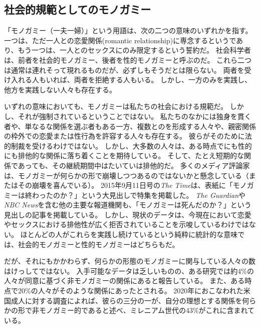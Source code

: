 \documentclass[paper=a4,book,openany]{jlreq} \usepackage{mystyle}
\begin{document}
\subsection{社会的規範としてのモノガミー}

「{モノガミー}（一夫一婦）」という用語は、次の二つの意味のいずれかを指す。
一つは、ただ一人との恋愛関係(romantic relationship)に専念するというであり、もう一つは、一人とのセックスにのみ限定するという誓約だ。
社会科学者は、前者を社会的モノガミー、後者を性的モノガミーと呼ぶのだ。
これら二つは通常は連れそって現れるものだが、必ずしもそうだとは限らない。
両者を受け入れる人もいれば、両者を拒絶する人もいる。
しかし、一方のみを実践し、他方を実践しない人々も存在する。

いずれの意味においても、モノガミーは私たちの社会における規範だ。
しかし、それが強制されているということではない。
私たちのなかには独身を貫く者や、単なるな関係を選ぶ者もある一方、複数とのを形成する人々や、親密関係の枠外での恋愛または性行為を許容する人々も存在する。
彼らがそのために法的制裁を受けるわけではない。
しかし、大多数の人々は、ある時点でにも性的にも排他的な関係に落ち着くことを期待している。
そして、たとえ短期的な関係であっても、その継続期間中はたいていは排他的だ。
多くのメディア評論家は、モノガミーが何らかの形で崩壊しつつあるのではないかと懸念している（またはその崩壊を喜んでいる）。
2015年9月11日号の\emph{The Time}は、表紙に「モノガミーは終わったのか？」という大見出しで特集を掲載した\citep{magazine15:_is_monog_over}。
\emph{The Guardian}や\emph{NBC News}を含む他の主要な報道機関も、「モノガミーは死んだのか？」という見出しの記事を掲載している\citep{alexander05:_is_monog_dead,jeffries12:_sex_issue}。
しかし、現状のデータは、今現在において恋愛やセックスにおける排他性が広く拒否されていることを示唆しているわけではない。
ほとんどの人がこれらを実践し続けているという純粋に統計的な意味では、社会的モノガミーと性的モノガミーはどちらもだ。

だが、それにもかかわらず、何らかの形態のモノガミーに関与している人々の数はけっしてではない。
入手可能なデータは乏しいものの、ある研究では約4\%の人々が同意に基づく非モノガミーの関係にあると報告している。
また、ある時点で20\%の人々がそのような関係にあったとされる\citep{haupert17:_preval_exper_consen_nonmon_relat}。
2020年におこなわれた米国成人に対する調査によれば、彼らの三分の一が、自分の理想とする関係を何らかの形で非モノガミー的であると述べ、ミレニアム世代の43\%がこれに含まれている\citep{ballard20:_millen_are_less_likel_want_monog_relat}。
\end{document}

